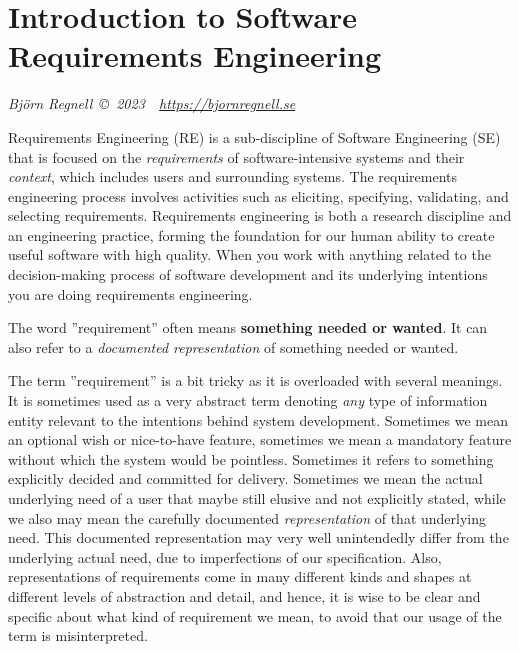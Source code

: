 
\chapter*{Introduction to Software Requirements Engineering}

\textit{Björn Regnell\hfill~\copyright~2023~~\url{https://bjornregnell.se}}

\vspace{3em}

\noindent Requirements Engineering (RE) is a sub-discipline of Software Engineering (SE) that is focused on the \textit{requirements} of software-intensive systems and their \textit{context}, which includes users and surrounding systems. 
The requirements engineering process involves activities such as eliciting, specifying, validating, and selecting requirements. 
Requirements engineering is both a research discipline and an engineering practice, forming the foundation for our human ability to create useful software with high quality. When you work with anything related to the decision-making process of software development and its underlying intentions you are doing requirements engineering.  

The word ''requirement'' often means \textbf{something needed or wanted}. It can also refer to a \emph{documented representation} of something needed or wanted. 

The term ''requirement'' is a bit tricky as it is overloaded with several meanings. It is sometimes used as a very abstract term denoting \textit{any} type of information entity relevant to the intentions behind system development.  Sometimes we mean an optional wish or nice-to-have feature, sometimes we mean a mandatory feature without which the system would be pointless. Sometimes it refers to something explicitly decided and committed for delivery. Sometimes we mean the actual underlying need of a user that maybe still elusive and not explicitly stated, while we also may mean the carefully documented \textit{representation} of that underlying need. This documented representation may very well unintendedly differ from the underlying actual need, due to imperfections of our specification. 
Also, representations of requirements come in many different kinds and shapes at different levels of abstraction and detail, and hence, it is wise to be clear and specific about what kind of requirement we mean, to avoid that our usage of the term is misinterpreted. 

